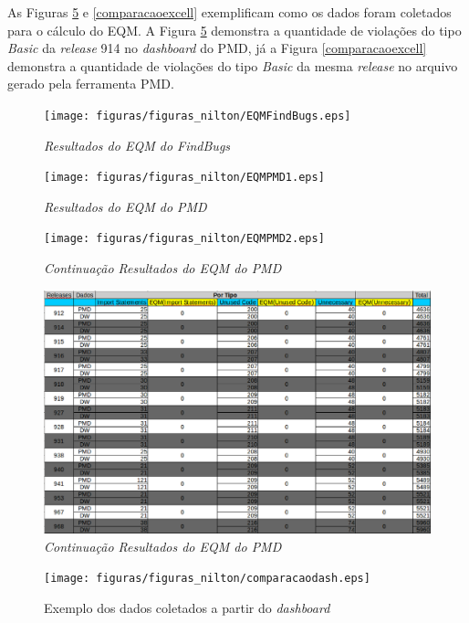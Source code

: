 As Figuras \ref{comparacaodash} e \ref{comparacaoexcell} exemplificam como os dados foram coletados para o cálculo do EQM. A Figura \ref{comparacaodash} demonstra a quantidade de violações do tipo \textit{Basic} da \textit{release} 914 no \textit{dashboard} do PMD, já a Figura \ref{comparacaoexcell} demonstra a quantidade de violações do tipo \textit{Basic} da mesma \textit{release} no arquivo gerado pela ferramenta PMD.

\begin{figure}[h!]
\centering
\texttt{[image: figuras/figuras\_nilton/EQMFindBugs.eps]}
\caption{\textit{Resultados do EQM do FindBugs}}
\label{EQMFindBugs}
\end{figure}

\begin{figure}[h!]
\centering
\texttt{[image: figuras/figuras\_nilton/EQMPMD1.eps]}
\caption{\textit{Resultados do EQM do PMD}}
\label{EQMPMD1}
\end{figure}

\begin{figure}[h!]
\centering
\texttt{[image: figuras/figuras\_nilton/EQMPMD2.eps]}
\caption{\textit{Continuação Resultados do EQM do PMD}}
\label{EQMPMD2}
\end{figure}

\begin{figure}[h!]
\centering
\includegraphics[keepaspectratio=false,scale=0.45,angle=90]{figuras/figuras_nilton/EQMPMD3.eps}
\caption{\textit{Continuação Resultados do EQM do PMD}}
\label{EQMPMD3}
\end{figure}

\begin{figure}[h!]
\centering
\texttt{[image: figuras/figuras\_nilton/comparacaodash.eps]}
\caption{Exemplo dos dados coletados a partir do \textit{dashboard}}
\label{comparacaodash}
\end{figure}

